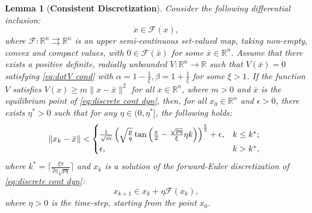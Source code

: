 \documentclass[letterpaper]{article}
\newtheorem{lemma}{Lemma} %
\begin{document}
\begin{lemma}[\textbf{Consistent Discretization}]\label{lemma: weak conv disc FxTS}
    Consider the following differential inclusion:
    \begin{equation}\label{eq:discrete cont dyn}
        \dot x \in \mathcal F(x),
    \end{equation}
    where $\mathcal{F}: \mathbb{R}^n\rightrightarrows\mathbb{R}^n$ is an upper semi-continuous set-valued map, taking non-empty, convex and compact values, with $0\in\mathcal{F}(\bar{x})$ for some $\bar x\in \mathbb R^n$. Assume that there exists a positive definite, radially unbounded $V: \mathbb R^n\rightarrow\mathbb R$ such that $V(\bar{x}) = 0$ satisfying \eqref{eq:dotV cond} with $\alpha = 1-\frac{1}{\xi}, \beta = 1+\frac{1}{\xi}$ for some $\xi>1$.
    If the function $V$ satisfies $V(x)\geq m\|x-\bar{x}\|^2$ for all $x\in\mathbb{R}^n$, where $m>0$ and $\bar x$ is the equilibrium point of \eqref{eq:discrete cont dyn}, then, for all $x_0\in\mathbb{R}^n$ and $\epsilon>0$, there exists $\eta^*>0$ such that for any $\eta\in (0,\eta^*]$, the following holds:{\small
    \begin{align}\label{eq:x disc bound}
        \hspace{-5pt}\|x_k-\bar{x}\|<
        \begin{cases}
        \frac{1}{\sqrt{m}}\left(\sqrt{\frac{p}{q}}\tan\left(\frac{\pi}{2}-\frac{\sqrt{pq}}{\xi}\eta k\right)\right)^\frac{\xi}{2}+\epsilon, & k\leq k^*;\\
        \epsilon, & k>k^*,
        \end{cases}
    \end{align}}\normalsize
    where $k^* = \Big\lceil\frac{\xi\pi}{2\eta\sqrt{pq}}\Big\rceil$ and $x_k$ is a solution of the forward-Euler discretization of \eqref{eq:discrete cont dyn}:
\begin{equation}\label{eq:discrete dyn FxTS}
    x_{k+1} \in x_k + \mathcal \eta \mathcal F(x_k),
\end{equation}
where $\eta>0$ is the time-step, starting from the point $x_0$.
\end{lemma}
\end{document}

